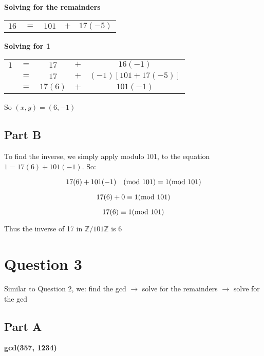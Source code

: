 \documentclass{article}
\numberwithin{equation}{subsection}
\begin{document}
	\vspace{15pt}

	\textbf{Solving for the remainders}
	
	\begin{tabular}{c c c c c}
		$16$	&	$=$	&	$101$	&	$+$	&	$17(-5)$	\\
	\end{tabular}

	\vspace{15pt}
	\textbf{Solving for 1}

	\begin{tabular}{c c c c c}
		$1$	&	$=$	&	$17$	&	$+$	&	$16(-1)$	\\
				&	$=$	&	$17$	&	$+$	&	$(-1)[101+17(-5)]$	\\
			&	$=$	&	$17(6)$	&	$+$	&	$101(-1)$	\\
	\end{tabular}

	So $(x,y) = (6,-1)$

	\vspace{25pt}
	\subsection*{Part B}
	To find the inverse, we simply apply modulo 101, to the equation $1=17(6)+101(-1)$. So:

	\begin{equation}\notag
		17(6) + 101(-1) \quad (\textrm{mod}\ 101) = 1 (\textrm{mod}\ 101)	
	\end{equation}

	\begin{equation}\notag
		17(6) + 0 \equiv 1 (\textrm{mod}\ 101)	
	\end{equation}

	\begin{equation}\notag
		17(6) \equiv 1 (\textrm{mod}\ 101)	
	\end{equation}

	Thus the inverse of 17 in $\mathbb{Z}/101\mathbb{Z}$ is 6

	\newpage
	\thispagestyle{fancy}

	\section*{Question 3}
	Similar to Question 2, we: find the gcd $\rightarrow$ solve for the remainders $\rightarrow$ solve for the gcd
	
	\subsection*{Part A}
	\textbf{gcd(357, 1234)}
\end{document}

